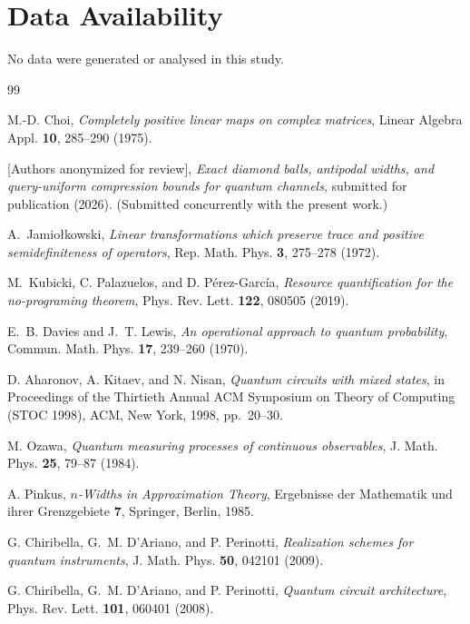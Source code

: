 \documentclass[11pt,a4paper]{article}
\begin{document}
\section*{Data Availability}
No data were generated or analysed in this study.

\begin{thebibliography}{99}

M.-D. Choi, \emph{Completely positive linear maps on complex matrices}, Linear Algebra Appl. \textbf{10}, 285--290 (1975).

[Authors anonymized for review], \emph{Exact diamond balls, antipodal widths, and query-uniform compression bounds for quantum channels}, submitted for publication (2026). (Submitted concurrently with the present work.)

A.~Jamio{\l}kowski, \emph{Linear transformations which preserve trace and positive semidefiniteness of operators}, Rep. Math. Phys. \textbf{3}, 275--278 (1972).

M.~Kubicki, C. Palazuelos, and D. P\'erez-Garc\'ia, \emph{Resource quantification for the no-programing theorem}, Phys. Rev. Lett. \textbf{122}, 080505 (2019).

E.~B. Davies and J.~T. Lewis, \emph{An operational approach to quantum probability}, Commun. Math. Phys. \textbf{17}, 239--260 (1970).

D. Aharonov, A. Kitaev, and N. Nisan, \emph{Quantum circuits with mixed states}, in Proceedings of the Thirtieth Annual ACM Symposium on Theory of Computing (STOC 1998), ACM, New York, 1998, pp.~20--30.

M. Ozawa, \emph{Quantum measuring processes of continuous observables}, J. Math. Phys. \textbf{25}, 79--87 (1984).

A. Pinkus, \emph{$n$-Widths in Approximation Theory}, Ergebnisse der Mathematik und ihrer Grenzgebiete \textbf{7}, Springer, Berlin, 1985.

G. Chiribella, G.~M. D'Ariano, and P. Perinotti, \emph{Realization schemes for quantum instruments}, J. Math. Phys. \textbf{50}, 042101 (2009).

G. Chiribella, G.~M. D'Ariano, and P. Perinotti, \emph{Quantum circuit architecture}, Phys. Rev. Lett. \textbf{101}, 060401 (2008).


\end{thebibliography}
\end{document}
